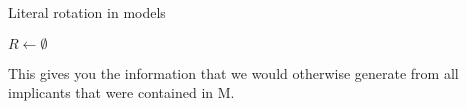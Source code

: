 \begin{algorithm}
\caption{{\sc Literal rotation in models }}
\DontPrintSemicolon
{}
$R \gets \emptyset$\;
\;

\end{algorithm}

This gives you the information that we would otherwise generate from all implicants that were contained in M.

